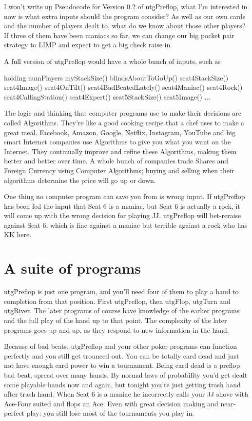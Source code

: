 I won't write up Pseudocode for Version 0.2 of utgPreflop, what I'm
interested in now is what extra inputs should the program consider?
As well as our own cards and the number of players dealt to, what do
we know about those other players? If three of them have been maniacs
so far, we can change our big pocket pair strategy to LIMP and expect
to get a big check raise in.

A full version of utgPreflop would have a whole bunch of inputs, such
as

holding
numPlayers
myStackSize()
blindsAboutToGoUp()
seat4StackSize()
seat4Image()
seat4OnTilt()
seat4BadBeatedLately()
seat4Maniac()
seat4Rock()
seat4CallingStation()
seat4Expert()
seat5StackSize()
seat5Image()
...

The logic and thinking that computer programs use to
make their decisions are called Algorithms. They're like a good
cooking recipe that a chef uses to make a great meal. Facebook,
Amazon, Google, Netflix, Instagram, YouTube and big smart Internet
companies use Algorithms to give you what you want on the Internet.
They continually improve and refine these Algorithms, making them
better and better over time. A whole bunch of companies trade Shares
and Foreign Currency using Computer Algorithms; buying and selling
when their algorithms determine the price will go up or down.

One thing no computer program can save you from is wrong input.
If utgPreflop has been fed the input that Seat 6 is a maniac,
but Seat 6 is actually a rock, it will come up with the wrong decision
for playing JJ. utgPreflop will bet-reraise against Seat 6; which is
fine against a maniac but terrible against a rock who has KK here.


\section*{A suite of programs}

utgPreflop is just one program, and you'll need four of them to
play a hand to completion from that position. First utgPreflop,
then utgFlop, utgTurn and utgRiver. The later programs of course
have knowledge of the earlier programs and the full play of the hand
up to that point. The complexity of the later programs goes up and up,
as they respond to new information in the hand.

Because of bad beats, utgPreflop and your other poker programs can
function perfectly and you still get trounced out. You can be totally
card dead and just not have enough card power to win a
tournament. Being card dead is a preflop bad beat,
spread over many hands. By normal laws of probability you'd get dealt
some playable hands now and again, but tonight you're just getting
trash hand after trash hand. When Seat 6 is a maniac he incorrectly
calls your JJ shove with Ace-Four suited and flops an Ace. Even with
great decision making and near-perfect play; you still lose most of
the tournaments you play in.

